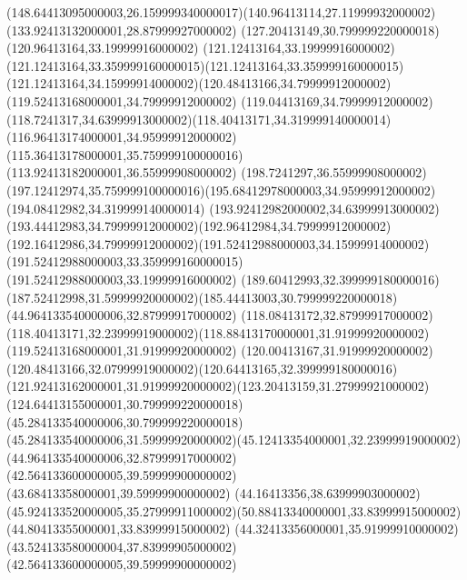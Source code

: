 {{	\curveto(148.64413095000003,26.159999340000017)(140.96413114,27.11999932000002)(133.92413132000001,28.87999927000002)
	\closepath
	\moveto(127.20413149,30.799999220000018)
	\lineto(120.96413164,33.19999916000002)
	\curveto(121.12413164,33.19999916000002)(121.12413164,33.359999160000015)(121.12413164,33.359999160000015)
	\curveto(121.12413164,34.15999914000002)(120.48413166,34.79999912000002)(119.52413168000001,34.79999912000002)
	\curveto(119.04413169,34.79999912000002)(118.7241317,34.63999913000002)(118.40413171,34.319999140000014)
	\curveto(116.96413174000001,34.95999912000002)(115.36413178000001,35.759999100000016)(113.92413182000001,36.55999908000002)
	\lineto(198.7241297,36.55999908000002)
	\curveto(197.12412974,35.759999100000016)(195.68412978000003,34.95999912000002)(194.08412982,34.319999140000014)
	\curveto(193.92412982000002,34.63999913000002)(193.44412983,34.79999912000002)(192.96412984,34.79999912000002)
	\curveto(192.16412986,34.79999912000002)(191.52412988000003,34.15999914000002)(191.52412988000003,33.359999160000015)
	\lineto(191.52412988000003,33.19999916000002)
	\curveto(189.60412993,32.399999180000016)(187.52412998,31.59999920000002)(185.44413003,30.799999220000018)
	\closepath
	\moveto(44.964133540000006,32.87999917000002)
	\lineto(118.08413172,32.87999917000002)
	\curveto(118.40413171,32.23999919000002)(118.88413170000001,31.91999920000002)(119.52413168000001,31.91999920000002)
	\curveto(120.00413167,31.91999920000002)(120.48413166,32.07999919000002)(120.64413165,32.399999180000016)
	\curveto(121.92413162000001,31.91999920000002)(123.20413159,31.27999921000002)(124.64413155000001,30.799999220000018)
	\lineto(45.284133540000006,30.799999220000018)
	\curveto(45.284133540000006,31.59999920000002)(45.12413354000001,32.23999919000002)(44.964133540000006,32.87999917000002)
	\closepath
	\moveto(42.564133600000005,39.59999900000002)
	\lineto(43.68413358000001,39.59999900000002)
	\curveto(44.16413356,38.63999903000002)(45.924133520000005,35.27999911000002)(50.88413340000001,33.83999915000002)
	\lineto(44.80413355000001,33.83999915000002)
	\curveto(44.32413356000001,35.91999910000002)(43.524133580000004,37.83999905000002)(42.564133600000005,39.59999900000002)
	\closepath
}
}
{
}
